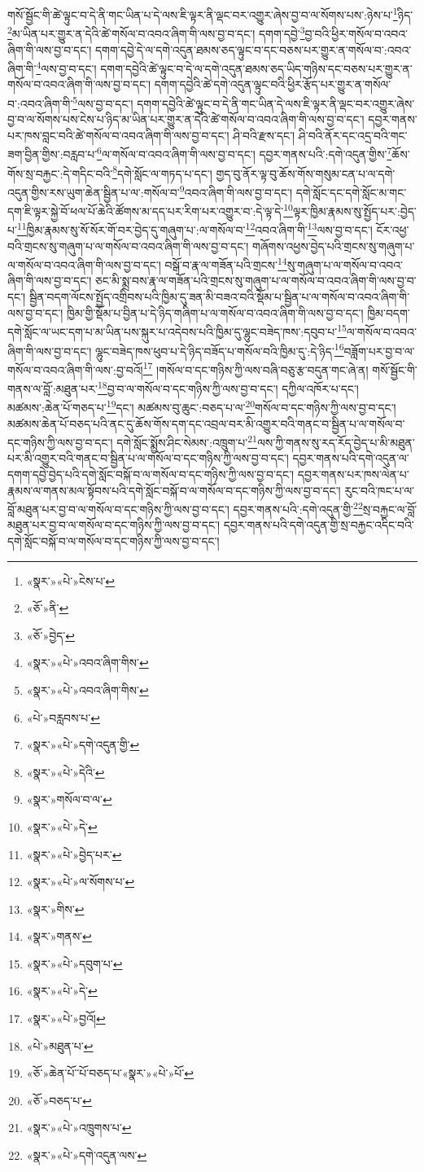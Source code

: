 གསོ་སྦྱོང་གི་ཚེ་ལྟུང་བ་དེ་ནི་གང་ཡིན་པ་དེ་ལས་ཇི་ལྟར་ནི་ལྡང་བར་འགྱུར་ཞེས་བྱ་བ་ལ་སོགས་པས་:ཉེས་པ་\footnote{«སྣར་»«པེ་»ངེས་པ་}ཉིད་\footnote{«ཅོ་»ནི་}མ་ཡིན་པར་གྱུར་ན་དེའི་ཚེ་གསོལ་བ་འབའ་ཞིག་གི་ལས་བྱ་བ་དང་། དགག་དབྱེ་\footnote{«ཅོ་»བྱེད་}བྱ་བའི་ཕྱིར་གསོལ་བ་འབའ་ཞིག་གི་ལས་བྱ་བ་དང་། དགག་དབྱེ་དེ་ལ་དགེ་འདུན་ཐམས་ཅད་ལྟུང་བ་དང་བཅས་པར་གྱུར་ན་གསོལ་བ་:འབའ་ཞིག་གི་\footnote{«སྣར་»«པེ་»འབའ་ཞིག་གིས་}ལས་བྱ་བ་དང་། དགག་དབྱེའི་ཚེ་ལྟུང་བ་དེ་ལ་དགེ་འདུན་ཐམས་ཅད་ཡིད་གཉིས་དང་བཅས་པར་གྱུར་ན་གསོལ་བ་འབའ་ཞིག་གི་ལས་བྱ་བ་དང་། དགག་དབྱེའི་ཚེ་དགེ་འདུན་ལྟུང་བའི་ཕྱིར་རྩོད་པར་གྱུར་ན་གསོལ་བ་:འབའ་ཞིག་གི་\footnote{«སྣར་»«པེ་»འབའ་ཞིག་གིས་}ལས་བྱ་བ་དང་། དགག་དབྱེའི་ཚེ་ལྟུང་བ་དེ་ནི་གང་ཡིན་དེ་ལས་ཇི་ལྟར་ནི་ལྡང་བར་འགྱུར་ཞེས་བྱ་བ་ལ་སོགས་པས་ངེས་པ་ཉིད་མ་ཡིན་པར་གྱུར་ན་དེའི་ཚེ་གསོལ་བ་འབའ་ཞིག་གི་ལས་བྱ་བ་དང་། དབྱར་གནས་པར་ཁས་བླང་བའི་ཚེ་གསོལ་བ་འབའ་ཞིག་གི་ལས་བྱ་བ་དང་། ཤི་བའི་རྫས་དང་། ཤི་བའི་ནོར་དང་འདྲ་བའི་གང་ཟག་བྱིན་གྱིས་:བརླབ་པ་\footnote{«པེ་»བརླབས་པ་}ལ་གསོལ་བ་འབའ་ཞིག་གི་ལས་བྱ་བ་དང་། དབྱར་གནས་པའི་:དགེ་འདུན་གྱིས་\footnote{«སྣར་»«པེ་»དགེ་འདུན་གྱི་}ཆོས་གོས་སྲ་བརྐྱང་:དེ་གདིང་བའི་\footnote{«སྣར་»«པེ་»དེའི་}དགེ་སློང་ལ་གཏད་པ་དང་། གྱད་བུ་ནོར་ལྟ་བུ་ཆོས་གོས་གསུམ་ངན་པ་ལ་དགེ་འདུན་གྱིས་རས་ཡུག་ཆེན་སྦྱིན་པ་ལ་:གསོལ་བ་\footnote{«སྣར་»གསོལ་བ་ལ་}འབའ་ཞིག་གི་ལས་བྱ་བ་དང་། དགེ་སློང་དང་དགེ་སློང་མ་གང་དག་ཇི་ལྟར་སྐྱེ་བོ་ཕལ་པོ་ཆེའི་ཚོགས་མ་དད་པར་རིག་པར་འགྱུར་བ་:དེ་ལྟ་དེ་\footnote{«སྣར་»«པེ་»དེ་}ལྟར་ཁྱིམ་རྣམས་སུ་སྤྱོད་པར་:བྱེད་པ་\footnote{«སྣར་»«པེ་»བྱེད་པར་}ཁྱིམ་རྣམས་སུ་སོ་སོར་གོ་བར་བྱེད་དུ་གཞུག་པ་:ལ་གསོལ་བ་\footnote{«སྣར་»«པེ་»ལ་སོགས་པ་}འབའ་ཞིག་གི་\footnote{«སྣར་»གིས་}ལས་བྱ་བ་དང་། ངོར་འཕྱ་བའི་གྲངས་སུ་གཞུག་པ་ལ་གསོལ་བ་འབའ་ཞིག་གི་ལས་བྱ་བ་དང་། གཞོགས་འཕྱས་བྱེད་པའི་གྲངས་སུ་གཞུག་པ་ལ་གསོལ་བ་འབའ་ཞིག་གི་ལས་བྱ་བ་དང་། བསྒོ་བ་རྣ་ལ་གཟོན་པའི་གྲངས་\footnote{«སྣར་»གནས་}སུ་གཞུག་པ་ལ་གསོལ་བ་འབའ་ཞིག་གི་ལས་བྱ་བ་དང་། ཅང་མི་སྨྲ་བས་རྣ་ལ་གཟོན་པའི་གྲངས་སུ་གཞུག་པ་ལ་གསོལ་བ་འབའ་ཞིག་གི་ལས་བྱ་བ་དང་། སྦྱིན་བདག་ལོངས་སྤྱོད་འགྲིབས་པའི་ཁྱིམ་དུ་ཟན་མི་བཟའ་བའི་སྡོམ་པ་སྦྱིན་པ་ལ་གསོལ་བ་འབའ་ཞིག་གི་ལས་བྱ་བ་དང་། ཁྱིམ་གྱི་སྡོམ་པ་བྱིན་པ་དེ་ཉིད་གཞིག་པ་ལ་གསོལ་བ་འབའ་ཞིག་གི་ལས་བྱ་བ་དང་། ཁྱིམ་བདག་དགེ་སློང་ལ་ཡང་དག་པ་མ་ཡིན་པས་སྐུར་པ་འདེབས་པའི་ཁྱིམ་དུ་ལྷུང་བཟེད་ཁས་:དབུབ་པ་\footnote{«སྣར་»«པེ་»དབུག་པ་}ལ་གསོལ་བ་འབའ་ཞིག་གི་ལས་བྱ་བ་དང་། ལྷུང་བཟེད་ཁས་ཕུབ་པ་དེ་ཉིད་བཟོད་པ་གསོལ་བའི་ཁྱིམ་དུ་:དེ་ཉིད་\footnote{«སྣར་»«པེ་»དེ་}བཟློག་པར་བྱ་བ་ལ་གསོལ་བ་འབའ་ཞིག་གི་ལས་:བྱ་བའོ།\footnote{«སྣར་»«པེ་»བྱའོ།} །གསོལ་བ་དང་གཉིས་ཀྱི་ལས་བཞི་བཅུ་རྩ་བདུན་གང་ཞེ་ན། གསོ་སྦྱོང་གི་གནས་ལ་བློ་:མཐུན་པར་\footnote{«པེ་»མཐུན་པ་}བྱ་བ་ལ་གསོལ་བ་དང་གཉིས་ཀྱི་ལས་བྱ་བ་དང་། དཀྱིལ་འཁོར་པ་དང་། མཚམས་:ཆེན་པོ་གཅད་པ་\footnote{«ཅོ་»ཆེན་པོ་་པོ་བཅད་པ་«སྣར་»«པེ་»པོ་}དང་། མཚམས་བུ་ཆུང་:བཅད་པ་ལ་\footnote{«ཅོ་»བཅད་པ་}གསོལ་བ་དང་གཉིས་ཀྱི་ལས་བྱ་བ་དང་། མཚམས་ཆེན་པོ་བཅད་པའི་ནང་དུ་ཆོས་གོས་དག་དང་འབྲལ་བར་མི་འགྱུར་བའི་གནང་བ་སྦྱིན་པ་ལ་གསོལ་བ་དང་གཉིས་ཀྱི་ལས་བྱ་བ་དང་། དགེ་སློང་སྨྱོས་ཤིང་སེམས་:འཁྲུག་པ་\footnote{«སྣར་»«པེ་»འཁྲུགས་པ་}ལས་ཀྱི་གནས་སུ་རད་རོད་བྱེད་པ་མི་མཐུན་པར་མི་འགྱུར་བའི་གནང་བ་སྦྱིན་པ་ལ་གསོལ་བ་དང་གཉིས་ཀྱི་ལས་བྱ་བ་དང་། དབྱར་གནས་པའི་དགེ་འདུན་ལ་དགག་དབྱེ་བྱེད་པའི་དགེ་སློང་བསྐོ་བ་ལ་གསོལ་བ་དང་གཉིས་ཀྱི་ལས་བྱ་བ་དང་། དབྱར་གནས་པར་ཁས་ལེན་པ་རྣམས་ལ་གནས་མལ་སྟོབས་པའི་དགེ་སློང་བསྐོ་བ་ལ་གསོལ་བ་དང་གཉིས་ཀྱི་ལས་བྱ་བ་དང་། རུང་བའི་ཁང་པ་ལ་བློ་མཐུན་པར་བྱ་བ་ལ་གསོལ་བ་དང་གཉིས་ཀྱི་ལས་བྱ་བ་དང་། དབྱར་གནས་པའི་:དགེ་འདུན་གྱི་\footnote{«སྣར་»«པེ་»དགེ་འདུན་ལས་}སྲ་བརྐྱང་ལ་བློ་མཐུན་པར་བྱ་བ་ལ་གསོལ་བ་དང་གཉིས་ཀྱི་ལས་བྱ་བ་དང་། དབྱར་གནས་པའི་དགེ་འདུན་གྱི་སྲ་བརྐྱང་འདིང་བའི་དགེ་སློང་བསྐོ་བ་ལ་གསོལ་བ་དང་གཉིས་ཀྱི་ལས་བྱ་བ་དང་། 